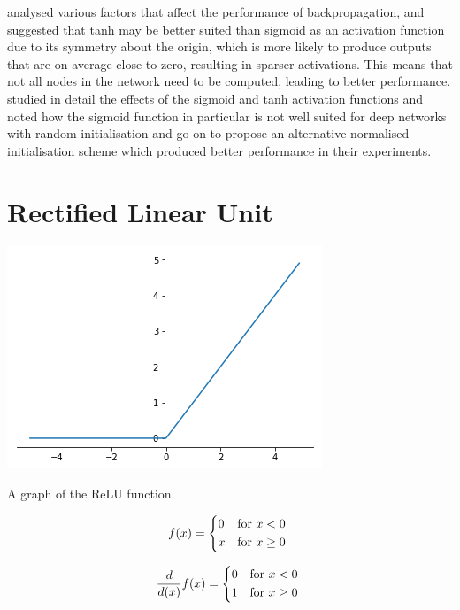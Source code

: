 \citet{lecun2012efficient} analysed various factors that affect the performance of backpropagation, and suggested that tanh may be better suited than sigmoid as an activation function due to its symmetry about the origin, which is more likely to produce outputs that are on average close to zero, resulting in sparser activations. This means that not all nodes in the network need to be computed, leading to better performance. \citet{glorot2010understanding} studied in detail the effects of the sigmoid and tanh activation functions and noted how the sigmoid function in particular is not well suited for deep networks with random initialisation and go on to propose an alternative normalised initialisation scheme which produced better performance in their experiments.

\section{Rectified Linear Unit}\label{sec:relu}
\begin{marginfigure}
  \includegraphics{graphics/activation_functions/relu_function.png}
  \caption{
    A graph of the ReLU function.
  }
  \label{fig:relugraph}
\end{marginfigure}

\begin{equation}\label{relufunction}
    f(x) =
      \begin{dcases*}
                                       0 & \text{for $x < 0$} \\
                                       x & \text{for $x \geq 0$} \\
      \end{dcases*}
\end{equation}

\begin{equation}\label{relufunctionderivative}
    \frac{d}{d(x)}f(x) =
      \begin{dcases*}
                                       0 & \text{for $x < 0$} \\
                                       1 & \text{for $x \geq 0$} \\
      \end{dcases*}
\end{equation}

